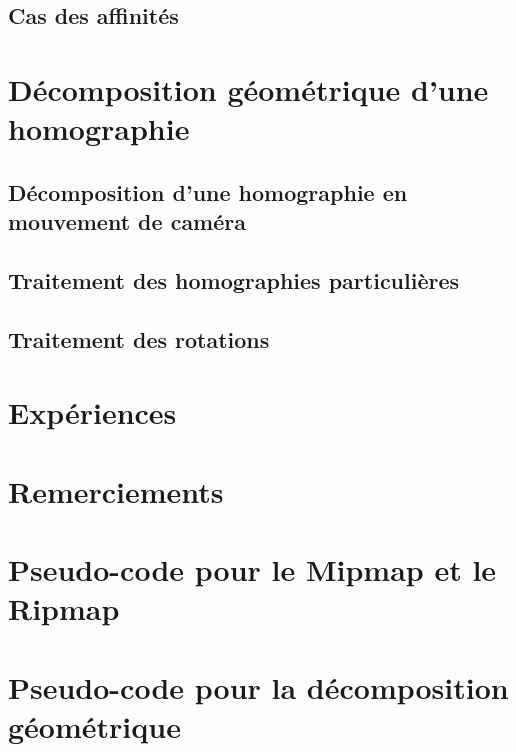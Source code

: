\documentclass[a4paper,11pt]{article}
\begin{document}
		\subsection{Cas des affinités}
	\section{Décomposition géométrique d'une homographie}
		\subsection{Décomposition d'une homographie en mouvement de caméra}
		\subsection{Traitement des homographies particulières}
			\label{HomoboxRipmap}
		\subsection{Traitement des rotations}
			\label{YaroSzeli}
	\section{Expériences}
		
		
	\section{Remerciements}
	\appendix
	\section{Pseudo-code pour le Mipmap et le Ripmap}
	\section{Pseudo-code pour la décomposition géométrique}
		
	\nocite{*}
	
	
\end{document}
